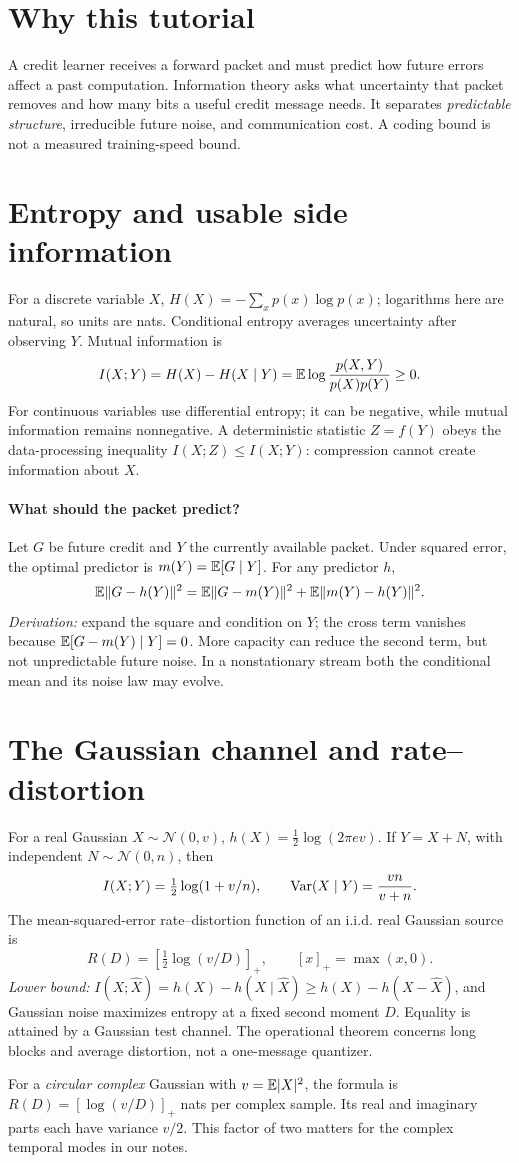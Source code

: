 \documentclass[11pt]{article}
\begin{document}
\section*{Why this tutorial}
A credit learner receives a forward packet and must predict how future errors affect a past computation. Information theory asks what uncertainty that packet removes and how many bits a useful credit message needs. It separates \emph{predictable structure}, irreducible future noise, and communication cost. A coding bound is not a measured training-speed bound.
\section{Entropy and usable side information}
For a discrete variable $X$, $H(X)=-\sum_xp(x)\log p(x)$; logarithms here are natural, so units are nats. Conditional entropy averages uncertainty after observing $Y$. Mutual information is
\[
 I(X;Y)=H(X)-H(X\mid Y)
 =\mathbb{E}\log\frac{p(X,Y)}{p(X)p(Y)}\ge0.
\]
For continuous variables use differential entropy; it can be negative, while mutual information remains nonnegative. A deterministic statistic $Z=f(Y)$ obeys the data-processing inequality $I(X;Z)\le I(X;Y)$: compression cannot create information about $X$.
\paragraph{What should the packet predict?} Let $G$ be future credit and $Y$ the currently available packet. Under squared error, the optimal predictor is $m(Y)=\mathbb{E}[G\mid Y]$. For any predictor $h$,
\[
 \mathbb{E}\|G-h(Y)\|^2
 =\mathbb{E}\|G-m(Y)\|^2+\mathbb{E}\|m(Y)-h(Y)\|^2.
\]
\emph{Derivation:} expand the square and condition on $Y$; the cross term vanishes because $\mathbb{E}[G-m(Y)\mid Y]=0$. More capacity can reduce the second term, but not unpredictable future noise. In a nonstationary stream both the conditional mean and its noise law may evolve.
\section{The Gaussian channel and rate--distortion}
For a real Gaussian $X\sim\mathcal N(0,v)$, $h(X)=\tfrac12\log(2\pi e v)$. If $Y=X+N$, with independent $N\sim\mathcal N(0,n)$, then
\[
 I(X;Y)=\tfrac12\log(1+v/n),\qquad
 \operatorname{Var}(X\mid Y)=\frac{vn}{v+n}.
\]
The mean-squared-error rate--distortion function of an i.i.d. real Gaussian source is
\[
 R(D)=\left[\tfrac12\log(v/D)\right]_+,\qquad [x]_+=\max(x,0).
\]
\emph{Lower bound:} $I(X;\widehat X)=h(X)-h(X\mid\widehat X)\ge h(X)-h(X-\widehat X)$, and Gaussian noise maximizes entropy at a fixed second moment $D$. Equality is attained by a Gaussian test channel. The operational theorem concerns long blocks and average distortion, not a one-message quantizer.
\begin{keyidea}
For a \emph{circular complex} Gaussian with $v=\mathbb{E}|X|^2$, the formula is $R(D)=[\log(v/D)]_+$ nats per complex sample. Its real and imaginary parts each have variance $v/2$. This factor of two matters for the complex temporal modes in our notes.
\end{keyidea}
\end{document}
